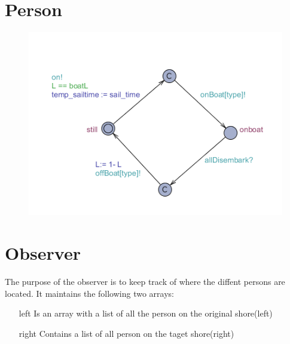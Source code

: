 















\section{Person}
\begin{figure}%
\includegraphics[width=\columnwidth]{pictures/person.png}%
\caption{}%
\label{}%
\end{figure}



















\section{Observer}
The purpose of the observer is to keep track of where the diffent persons are located. It maintains the following two arrays:
\begin{itemize}
	\item[left] Is an array with a list of all the person on the original shore(left)
	\item[right] Contains a list of all person on the taget shore(right)
\end{itemize}

